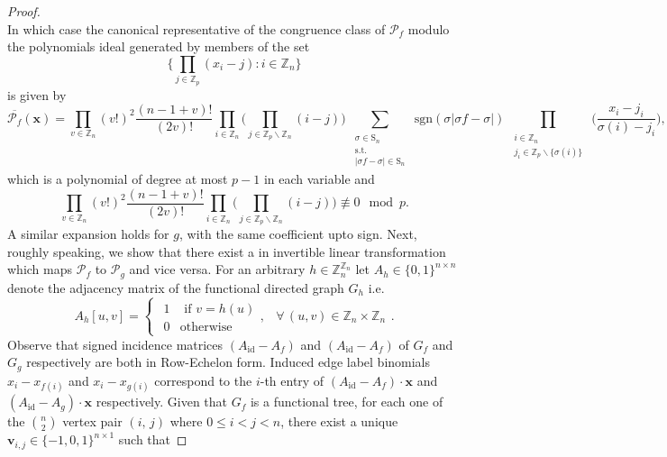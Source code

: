 \begin{proof}
\[\]
In which case the canonical representative of the congruence class of $\mathcal{P}_f$ modulo the polynomials ideal generated by members of the set
\[
\bigg\{\prod_{j\in\mathbb{Z}_{p}}(x_{i}-j):i\in\mathbb{Z}_{n}\bigg\}
\]
is given by
\begin{equation} \label{eq:new-graceful-evaluation}
\overline{\mathcal{P}_{f}}(\mathbf{x})=\prod_{v\in\mathbb{Z}_{n}}(v!)^{2}\frac{(n-1+v)!}{(2v)!}\prod_{i\in\mathbb{Z}_{n}}\big(\prod_{j\in\mathbb{Z}_{p}\backslash\mathbb{Z}_{n}}(i-j)\big)\sum_{\begin{array}{c}
\substack{\sigma\in\text{S}_{n}\\
\text{s.t.}\\
\left|\sigma f-\sigma\right|\in\text{S}_{n}
}
\end{array}}\text{sgn}(\sigma\left|\sigma f-\sigma\right|)\prod_{\begin{array}{c}
\substack{i\in\mathbb{Z}_{n}\\
j_{i}\in\mathbb{Z}_{p}\backslash\{\sigma(i)\}
}
\end{array}}\big(\frac{x_{i}-j_{i}}{\sigma(i)-j_{i}}\big),
\end{equation}
which is a polynomial of degree at most $p-1$ in each variable and
\[
\prod_{v\in\mathbb{Z}_{n}}(v!)^{2}\frac{(n-1+v)!}{(2v)!}\prod_{i\in\mathbb{Z}_{n}}\big(\prod_{j\in\mathbb{Z}_{p}\backslash\mathbb{Z}_{n}}(i-j)\big)\not\equiv0\mod p.
\]
A similar expansion holds for $g$, with the same coefficient upto sign. Next, roughly speaking, we show that there exist a in invertible linear transformation which  maps $\mathcal{P}_f$ to $\mathcal{P}_g$ and vice versa. For an arbitrary $h\in \mathbb{Z}_{n}^{\mathbb{Z}_{n}}$ let $A_{h}\in\{0,1\}^{n\times n}$ denote the adjacency matrix of the functional directed graph $G_h$ i.e.
\[
A_{h}[u,v]=\begin{cases}
\begin{array}{cc}
1 & \text{ if }v=h(u)\\
0 & \text{otherwise}
\end{array}, & \forall\,(u,v)\in\mathbb{Z}_{n}\times\mathbb{Z}_{n}\end{cases}.
\]
Observe that signed incidence matrices $(A_{\text{id}}-A_{f})$ and $(A_{\text{id}}-A_{f})$ of $G_f$ and $G_g$ respectively are both in Row-Echelon form. Induced edge label binomials $x_i-x_{f(i)}$ and $x_i-x_{g(i)}$ correspond to the $i$-th entry of $(A_{\text{id}}-A_{f})\cdot \mathbf{x}$ and $(A_{\text{id}}-A_{g})\cdot \mathbf{x}$ respectively. Given that $G_f$ is a functional tree, for each one of the ${n \choose 2}$ vertex pair $(i,\,j)$ where $0\le i < j <n$, there exist a unique $\mathbf{v}_{i,j}\in\{-1,0,1\}^{n\times1}$ such that

\end{proof}
